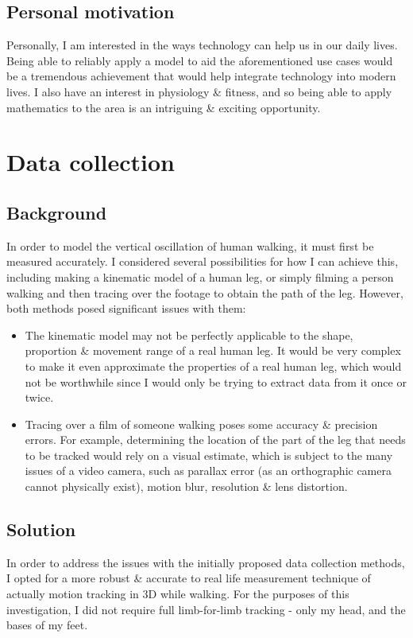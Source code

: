 \documentclass[12pt, a4paper]{article}
\begin{document}
\subsection{Personal motivation}
Personally, I am interested in the ways technology can help us in our daily
lives. Being able to reliably apply a model to aid the aforementioned use cases
would be a tremendous achievement that would help integrate technology into
modern lives. 
I also have an interest in physiology \& fitness,
and so being able to apply mathematics to the area is an intriguing \& exciting
opportunity.

\section{Data collection}
\subsection{Background}
In order to model the vertical oscillation of human walking, it must first be
measured accurately. I considered several possibilities for how I can achieve
this, including making a kinematic model of a human leg, or simply filming a
person walking and then tracing over the footage to obtain the path of the leg.
However, both methods posed significant issues with them:
\begin{itemize}
    \item The kinematic model may not be perfectly applicable to the shape,
          proportion \& movement range of a real human leg. It would be very
          complex to make it even approximate the properties of a real human
          leg, which would not be worthwhile since I would only be trying to
          extract data from it once or twice.
    \item Tracing over a film of someone walking poses some accuracy \&
          precision errors. For example, determining the location of the part of
          the leg that needs to be tracked would rely on a visual estimate,
          which is subject to the many issues of a video camera, such as
          parallax error (as an orthographic camera cannot physically exist),
          motion blur, resolution \& lens distortion.
\end{itemize}

\subsection{Solution}
In order to address the issues with the initially proposed data collection
methods, I opted for a more robust \& accurate to real life measurement technique
of actually motion tracking in 3D while walking. For the purposes of this
investigation, I did not require full limb-for-limb tracking - only my head, and
the bases of my feet. \\
\end{document}
